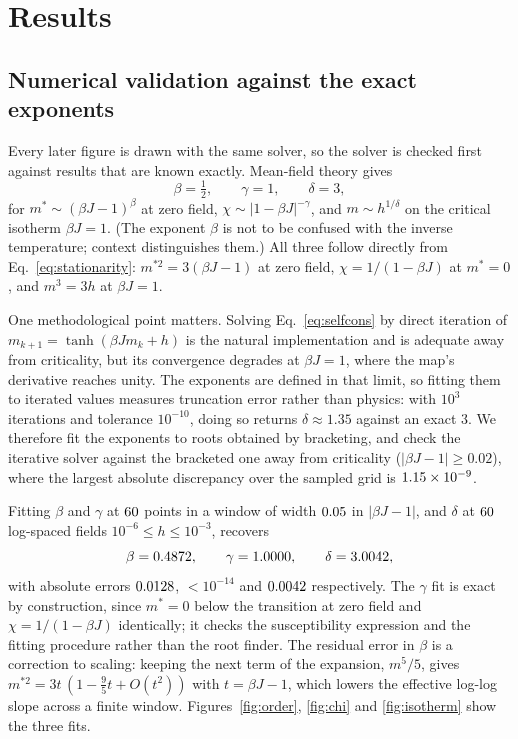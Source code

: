 \documentclass[preprint,12pt]{elsarticle}
\begin{document}
\section{Results}
\label{sec:results}

\subsection{Numerical validation against the exact exponents}
\label{sec:numerics}

Every later figure is drawn with the same solver, so the solver is checked first against
results that are known exactly. Mean-field theory gives \cite{goldenfeld1992}
\begin{equation}
\beta = \tfrac{1}{2}, \qquad \gamma = 1, \qquad \delta = 3,
\end{equation}
for $m^\ast \sim (\beta J - 1)^{\beta}$ at zero field, $\chi \sim |1 - \beta J|^{-\gamma}$,
and $m \sim h^{1/\delta}$ on the critical isotherm $\beta J = 1$. (The exponent $\beta$ is not
to be confused with the inverse temperature; context distinguishes them.) All three follow
directly from Eq.~\eqref{eq:stationarity}: $m^{\ast 2} = 3(\beta J - 1)$ at zero field,
$\chi = 1/(1 - \beta J)$ at $m^\ast = 0$, and $m^3 = 3h$ at $\beta J = 1$.

One methodological point matters. Solving Eq.~\eqref{eq:selfcons} by direct iteration of
$m_{k+1} = \tanh(\beta J m_k + h)$ is the natural implementation and is adequate away from
criticality, but its convergence degrades at $\beta J = 1$, where the map's derivative
reaches unity. The exponents are defined in that limit, so fitting them to iterated values
measures truncation error rather than physics: with $10^3$ iterations and tolerance
$10^{-10}$, doing so returns $\delta \approx 1.35$ against an exact $3$. We therefore fit the
exponents to roots obtained by bracketing, and check the iterative solver against the
bracketed one away from criticality ($|\beta J - 1| \ge 0.02$), where the largest absolute
discrepancy over the sampled grid is $1.15\times 10^{-9}$.

Fitting $\beta$ and $\gamma$ at $60$ points in a window of width $0.05$ in
$|\beta J - 1|$, and $\delta$ at $60$ log-spaced fields $10^{-6} \le h \le
10^{-3}$, recovers
\begin{equation}
\beta = 0.4872, \qquad \gamma = 1.0000, \qquad \delta = 3.0042,
\end{equation}
with absolute errors $0.0128$, $<10^{-14}$ and $0.0042$ respectively. The $\gamma$
fit is exact by construction, since $m^\ast = 0$ below the transition at zero field and
$\chi = 1/(1-\beta J)$ identically; it checks the susceptibility expression and the fitting
procedure rather than the root finder. The residual error in $\beta$ is a correction to
scaling: keeping the next term of the expansion, $m^5/5$, gives
$m^{\ast 2} = 3t\,(1 - \tfrac{9}{5}t + O(t^2))$ with $t = \beta J - 1$, which lowers the
effective log-log slope across a finite window. Figures~\ref{fig:order}, \ref{fig:chi} and
\ref{fig:isotherm} show the three fits.
\end{document}
